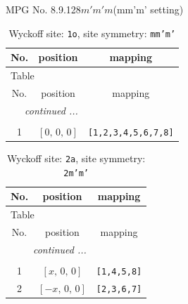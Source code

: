 \documentclass[fleqn,8pt]{jsarticle}
\begin{document}
\setcounter{MaxMatrixCols}{32}

\renewcommand{\tablename}{Table~}
\renewcommand{\figurename}{Figure~}
\begin{center}
\LARGE
MPG No. 8.9.128\quad$m'm'm$\quad(mm'm' setting)
\end{center}
\renewcommand{\arraystretch}{1.2}
\begin{longtable}{ccc}
\caption{Wyckoff site: {\tt 1o}, site symmetry: {\tt mm'm'}}
 \\
 \hline \hline
No. & position & mapping \\ \hline \endfirsthead

\multicolumn{2}{l}{\tablename\ \thetable{}} \\
 \hline \hline
No. & position & mapping \\ \hline \endhead

 \hline \hline
\multicolumn{2}{r}{\footnotesize\it continued ...} \\ \endfoot

 \hline \hline
\multicolumn{2}{r}{} \\ \endlastfoot

1 & $\left[ 0,\, 0,\, 0 \right]$ & {\tt [1,2,3,4,5,6,7,8]} \\
\end{longtable}
\renewcommand{\arraystretch}{1.2}
\begin{longtable}{ccc}
\caption{Wyckoff site: {\tt 2a}, site symmetry: {\tt 2m'm'}}
 \\
 \hline \hline
No. & position & mapping \\ \hline \endfirsthead

\multicolumn{2}{l}{\tablename\ \thetable{}} \\
 \hline \hline
No. & position & mapping \\ \hline \endhead

 \hline \hline
\multicolumn{2}{r}{\footnotesize\it continued ...} \\ \endfoot

 \hline \hline
\multicolumn{2}{r}{} \\ \endlastfoot

1 & $\left[ x,\, 0,\, 0 \right]$ & {\tt [1,4,5,8]} \\ \hline
2 & $\left[ - x,\, 0,\, 0 \right]$ & {\tt [2,3,6,7]} \\
\end{longtable}
\renewcommand{\arraystretch}{1.2}
\end{document}
